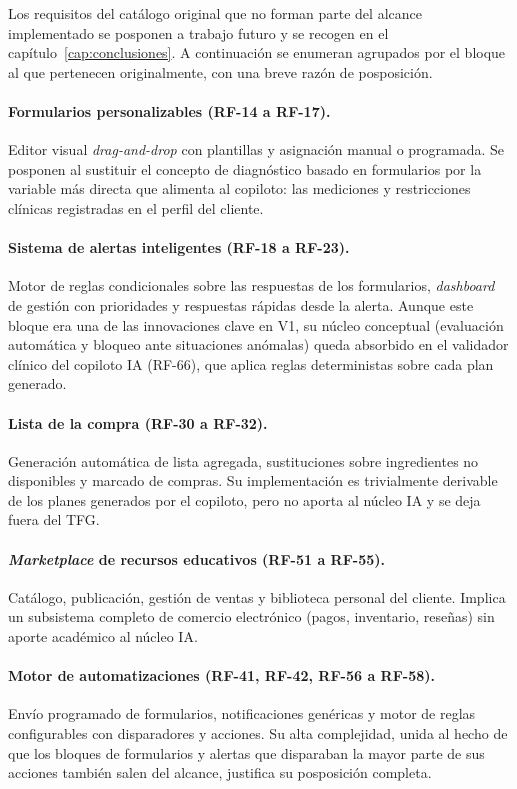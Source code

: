 Los requisitos del catálogo original que no forman parte del alcance implementado se posponen a trabajo futuro y se recogen en el capítulo~\ref{cap:conclusiones}. A continuación se enumeran agrupados por el bloque al que pertenecen originalmente, con una breve razón de posposición.

\paragraph{Formularios personalizables (RF-14 a RF-17).}
Editor visual \textit{drag-and-drop} con plantillas y asignación manual o programada. Se posponen al sustituir el concepto de diagnóstico basado en formularios por la variable más directa que alimenta al copiloto: las mediciones y restricciones clínicas registradas en el perfil del cliente.

\paragraph{Sistema de alertas inteligentes (RF-18 a RF-23).}
Motor de reglas condicionales sobre las respuestas de los formularios, \textit{dashboard} de gestión con prioridades y respuestas rápidas desde la alerta. Aunque este bloque era una de las innovaciones clave en V1, su núcleo conceptual (evaluación automática y bloqueo ante situaciones anómalas) queda absorbido en el validador clínico del copiloto IA (RF-66), que aplica reglas deterministas sobre cada plan generado.

\paragraph{Lista de la compra (RF-30 a RF-32).}
Generación automática de lista agregada, sustituciones sobre ingredientes no disponibles y marcado de compras. Su implementación es trivialmente derivable de los planes generados por el copiloto, pero no aporta al núcleo IA y se deja fuera del TFG.

\paragraph{\textit{Marketplace} de recursos educativos (RF-51 a RF-55).}
Catálogo, publicación, gestión de ventas y biblioteca personal del cliente. Implica un subsistema completo de comercio electrónico (pagos, inventario, reseñas) sin aporte académico al núcleo IA. 

\paragraph{Motor de automatizaciones (RF-41, RF-42, RF-56 a RF-58).}
Envío programado de formularios, notificaciones genéricas y motor de reglas configurables con disparadores y acciones. Su alta complejidad, unida al hecho de que los bloques de formularios y alertas que disparaban la mayor parte de sus acciones también salen del alcance, justifica su posposición completa.

